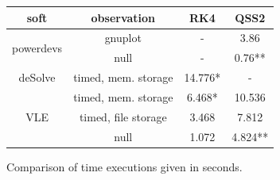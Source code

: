 \documentclass{article}
\theoremstyle{remark}
\begin{document}
\begin{figure}
\begin{center}
\begin{tabular}{|c|c|c|c|}
\hline
soft                      & observation         & RK4     & QSS2  \\\hline\hline
\multirow{2}{*}{powerdevs}& gnuplot             &  -      & 3.86  \\ \cline{2-4}
                          & null                &  -      & 0.76**  \\ \hline
deSolve                   & timed, mem. storage &  14.776* & -     \\ \hline
\multirow{3}{*}{VLE}      & timed, mem. storage &  6.468*  & 10.536\\\cline{2-4} 
                          & timed, file storage &  3.468  & 7.812 \\ \cline{2-4}
                          & null                &  1.072  & 4.824** \\ \hline
\end{tabular}
\caption{Comparison of time executions given in seconds.}
\end{center}
\end{figure}

%
%
\end{document}
